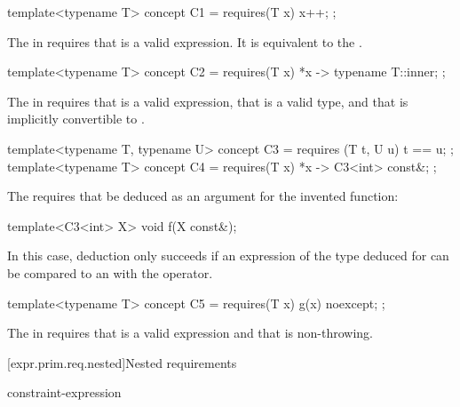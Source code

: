 \begin{example}
\begin{codeblock}
template<typename T> concept C1 = requires(T x) {
  {x++};
};
\end{codeblock}
The  in 
requires that  is a valid expression.
It is equivalent to the 
.

\begin{codeblock}
template<typename T> concept C2 = requires(T x) {
  {*x} -> typename T::inner;
};
\end{codeblock}

The  in 
requires that  is a valid expression,
that  is a valid type, and
that  is implicitly convertible to
.

\begin{codeblock}
template<typename T, typename U> concept C3 = requires (T t, U u) {
  t == u;
};
template<typename T> concept C4 = requires(T x) {
  {*x} -> C3<int> const&;
};
\end{codeblock}
The 
requires that  be deduced
as an argument for the invented function:
\begin{codeblock}
template<C3<int> X> void f(X const&);
\end{codeblock}
In this case, deduction only succeeds if
an expression of the type deduced for 
can be compared to an 
with the \tcode{==} operator.

\begin{codeblock}
template<typename T> concept C5 =
  requires(T x) {
    {g(x)} noexcept;
  };
\end{codeblock}

The  in 
requires that  is a valid expression and
that  is non-throwing.
\end{example}

[expr.prim.req.nested]{Nested requirements}
%

\begin{bnf}
\br
     constraint-expression \terminal{;}
\end{bnf}

